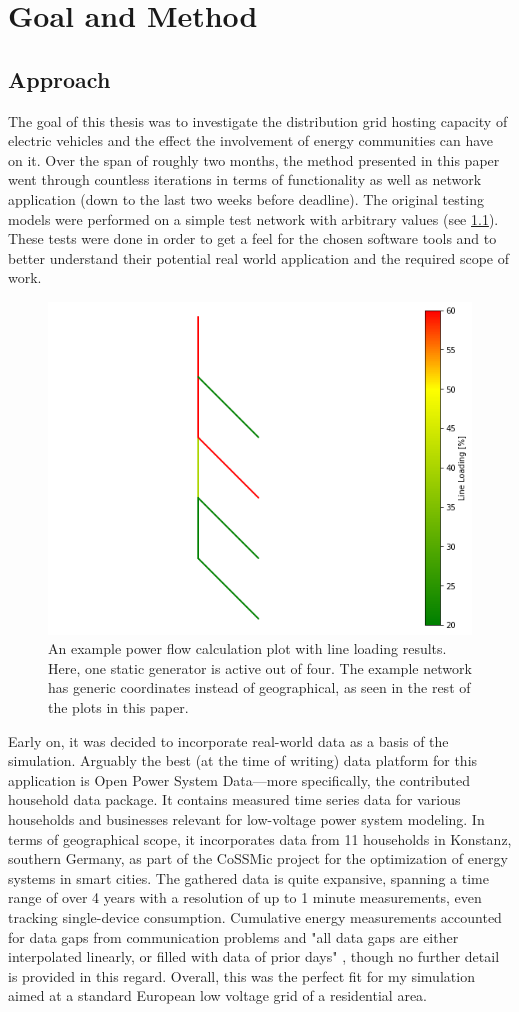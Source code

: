 \documentclass[a4paper,10pt]{report}
\begin{document}
\chapter{Goal and Method}
\section{Approach}\label{section_approach}
The goal of this thesis was to investigate the distribution grid hosting capacity of electric vehicles and the effect the involvement of energy communities can have on it. Over the span of roughly two months, the method presented in this paper went through countless iterations in terms of functionality as well as network application (down to the last two weeks before deadline). The original testing models were performed on a simple test network with arbitrary values (see \cref{test_network}). These tests were done in order to get a feel for the chosen software tools and to better understand their potential real world application and the required scope of work.

\begin{figure}[htpb]
	\centering
	\includegraphics[width=0.46\linewidth]{test_network}
	\caption[Example power flow network with generic coordinates]{An example power flow calculation plot with line loading results. Here, one static generator is active out of four. The example network has generic coordinates instead of geographical, as seen in the rest of the plots in this paper.}
	\label{test_network}
\end{figure}

Early on, it was decided to incorporate real-world data as a basis of the simulation. Arguably the best (at the time of writing) data platform for this application is Open Power System Data---more specifically, the contributed household data package. It contains measured time series data for various households and businesses relevant for low-voltage power system modeling. In terms of geographical scope, it incorporates data from 11 households in Konstanz, southern Germany, as part of the CoSSMic project for the optimization of energy systems in smart cities. The gathered data is quite expansive, spanning a time range of over 4 years with a resolution of up to 1 minute measurements, even tracking single-device consumption. Cumulative energy measurements accounted for data gaps from communication problems and "all data gaps are either interpolated linearly, or filled with data of prior days" \cite{OpenPowerSystemData}, though no further detail is provided in this regard. Overall, this was the perfect fit for my simulation aimed at a standard European low voltage grid of a residential area.
\end{document}
